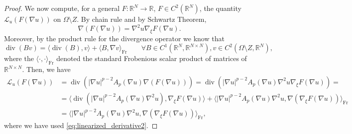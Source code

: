 \documentclass[10pt,a4paper]{amsart}
\numberwithin{equation}{section}
\newcommand{\R}{\mathbb{R}}
\renewcommand{\div}{\operatorname{div}}
\begin{document}
\begin{proof}
    We now compute, for a general $F: \R^N \to \R$, $F\in C^2(\R^N)$, the quantity $\mathcal{L}_u(F(\nabla u))$ on $\Omega \setminus Z$. By chain rule and by Schwartz Theorem, 
    \[
    \nabla (F(\nabla u)) = \nabla^2 u \nabla_\xi F (\nabla u).
    \]
    Moreover, by the product rule for the divergence operator we know that
    \begin{equation*}
        \div(Bv) = \langle \div(B) , v \rangle + \langle B , \nabla v \rangle_{\mathrm{Fr}} \qquad \forall B \in C^1(\R^N, \R^{N\times N}), v \in C^2(\Omega\setminus Z, \R^N),
    \end{equation*}
    where the $\langle \cdot , \cdot \rangle_{\mathrm{Fr}}$ denoted the standard Frobenious scalar product of matrices of $\R^{N\times N}$. Then, we have 
    \begin{equation*}
    \begin{split}
        \mathcal{L}_u(F(\nabla u)) &= 
        \div \left( |\nabla u|^{p-2} A_p(\nabla u)  \nabla (F(\nabla u)) \right)
        =
        \div \left( |\nabla u|^{p-2} A_p(\nabla u) \nabla^2 u \nabla_\xi F (\nabla u) \right)
        =
        \\
        &=\langle \div(|\nabla u|^{p-2} A_p(\nabla u) \nabla^2 u ) , \nabla_\xi F (\nabla u) \rangle + \langle |\nabla u|^{p-2} A_p(\nabla u) \nabla^2 u, \nabla (\nabla_\xi F (\nabla u) ) \rangle_{\mathrm{Fr}}
        \\
        &= \langle |\nabla u|^{p-2} A_p(\nabla u) \nabla^2 u, \nabla (\nabla_\xi F (\nabla u) ) \rangle_{\mathrm{Fr}},
    \end{split}
    \end{equation*}
    where we have used \eqref{eq:linearized_derivative2}. 
    

\end{proof}
\end{document}
